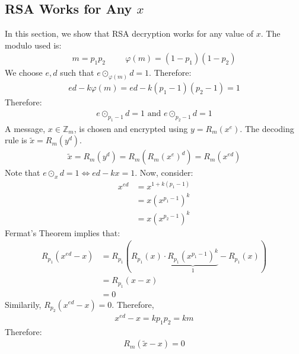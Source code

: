 \documentclass[]{book}
\begin{document}
\subsection*{RSA Works for Any $x$}
In this section, we show that RSA decryption works for any value of $x$. The modulo used is:
\begin{align}
m = p_1 p_2 \hspace{1cm} \varphi(m) = (1 - p_1) (1 - p_2)
\end{align}
We choose $e, d$ such that $e \odot_{\varphi(m)} d = 1$. Therefore:
\begin{align}
ed - k \varphi(m) = ed - k (p_1 - 1) (p_2 - 1) = 1
\end{align}
Therefore:
\begin{align}
e \odot_{p_1-1} d = 1 \text{ and } e \odot_{p_2-1} d = 1
\end{align}
A message, $x \in \mathbb{Z}_m$, is chosen and encrypted using $y = R_{m}(x^e)$. The decoding rule is $\tilde{x} = R_{m}(y^d)$.
\begin{align}
\tilde{x} = R_m(y^d) = R_m(R_m(x^e)^d) = R_m(x^{ed})
\end{align}
Note that $e \odot_x d = 1 \Leftrightarrow ed - kx = 1$. Now, consider:
\begin{align}
x^{ed} &= x^{1 + k(p_1 - 1)} \nonumber\\
&= x (x^{p_1 - 1})^k \nonumber\\
&= x (x^{p_2 - 1})^k
\end{align}
Fermat's Theorem implies that:
\begin{align}
R_{p_1}(x^{ed} - x) &= R_{p_1}(R_{p_1}(x) \cdot  \underbrace{R_{p_1}(x^{p_1 - 1})^k}_{1} - R_{p_1}(x) ) \nonumber \\
&= R_{p_1}(x - x) \nonumber\\
&= 0
\end{align}
Similarily, $R_{p_2}(x^{ed} - x) = 0$. Therefore,
\begin{align}
x^{ed} - x = k p_1 p_2 = k m
\end{align}
Therefore:
\begin{align}
R_m(\tilde{x} - x) = 0
\end{align}
\end{document}
